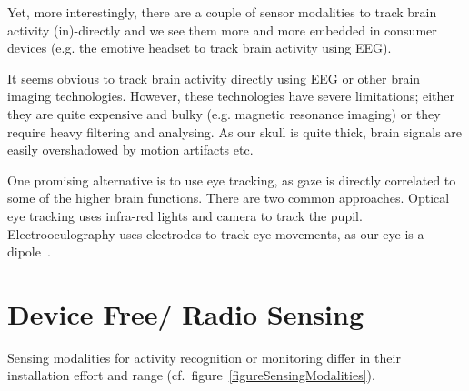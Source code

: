\documentclass[journal]{IEEEtran}
\begin{document}
Yet, more interestingly, there are a couple of sensor modalities to track brain activity (in)-directly and we see them more and more embedded in consumer devices (e.g. the emotive headset to track brain activity using EEG).

It seems obvious to track brain activity directly using EEG or other brain imaging technologies. However, these technologies have severe limitations; either they are quite expensive and bulky (e.g. magnetic resonance imaging) or they require heavy filtering and analysing. 
As our skull is quite thick, brain signals are easily overshadowed by motion artifacts etc. 

One promising alternative is to use eye tracking, as gaze is directly correlated to some of the higher brain functions. 
There are two common approaches.
Optical eye tracking uses infra-red lights and camera to track the pupil.
Electrooculography uses electrodes to track eye movements, as our eye is a dipole~\cite{Pervasive_bulling_2009}. \section{Device Free/ Radio Sensing} \label{sectionDeviceFree}
Sensing modalities for activity recognition or monitoring differ in their installation effort and range (cf.~figure~\ref{figureSensingModalities}).
\end{document}
